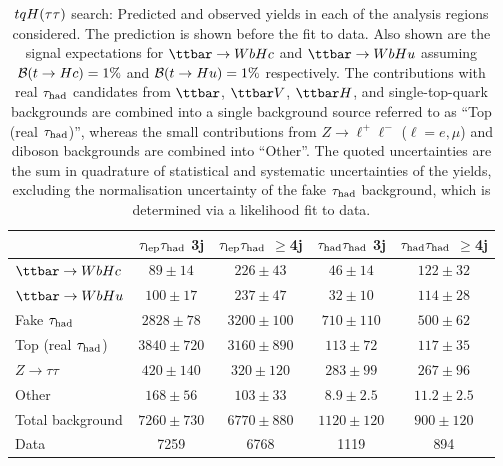 \begin{table}[htbp]
\small
\begin{center}
\begin{tabular}{l*{4}{c}}
\hline\hline
 & $\tau_{\mathrm{lep}} \tau_{\mathrm{had}}$ 3j & $\tau_{\mathrm{lep}} \tau_{\mathrm{had}}$ $\geq$4j & $\tau_{\mathrm{had}} \tau_{\mathrm{had}}$ 3j &  $\tau_{\mathrm{had}} \tau_{\mathrm{had}}$ $\geq$4j \\
\hline
$\Hc$  &   $ 89 \pm 14 $ &   $ 226 \pm 43 $ &   $ 46 \pm 14 $ &   $ 122 \pm 32 $ \\ 
$\Hu$  &   $ 100 \pm 17 $ &   $ 237 \pm 47 $ &   $ 32 \pm 10 $ &   $ 114 \pm 28 $ \\ 
\hline
Fake $\tau_{\mathrm{had}}$  &   $ 2828 \pm 78 $ &   $ 3200 \pm 100 $ &   $ 710 \pm 110 $ &   $ 500 \pm 62 $ \\
Top (real $\tau_{\mathrm{had}}$)  &   $ 3840 \pm 720 $ &   $ 3160 \pm 890 $ &   $ 113 \pm 72 $ &   $ 117 \pm 35 $ \\  
$Z \to \tau\tau$  &   $ 420 \pm 140 $ &   $ 320 \pm 120 $ &   $ 283 \pm 99 $ &   $ 267 \pm 96 $ \\ 
Other  &   $ 168 \pm 56 $ &   $ 103 \pm 33 $ &   $ 8.9 \pm 2.5 $ &   $ 11.2 \pm 2.5 $ \\ 
\hline
Total background  &   $ 7260 \pm 730 $ &   $ 6770 \pm 880 $ &   $ 1120 \pm 120 $ &   $ 900 \pm 120 $ \\ 
\hline
Data  & 7259  & 6768  & 1119  & 894  \\
\hline\hline    
\end{tabular}

%
\end{center}
\caption{
$tqH(\tau\tau)$ search: Predicted and observed yields in each of the analysis regions considered.
The prediction is shown before the fit to data. Also shown are the signal expectations for 
$\Hc$ and $\Hu$ assuming $\mathcal{B}(t\to Hc)=1\%$ and $\mathcal{B}(t\to Hu)=1\%$ respectively.
The contributions with real $\tau_{\mathrm{had}}$ candidates from $\ttbar$,  $\ttbar V$, $\ttbar H$, and single-top-quark backgrounds are combined into
a single background source referred to as ``Top (real $\tau_{\mathrm{had}}$)'', whereas the small contributions from 
$Z\to \ell^+\ell^-$ ($\ell = e, \mu$) and diboson backgrounds are combined into ``Other''. 
The quoted uncertainties are the sum in quadrature of statistical and systematic uncertainties of the yields, 
excluding the normalisation uncertainty of the fake $\tau_{\mathrm{had}}$ background, which is determined via a likelihood fit to data.
}
\label{tab:Htautau_Prefit_Yields_Unblind}
\end{table} 

